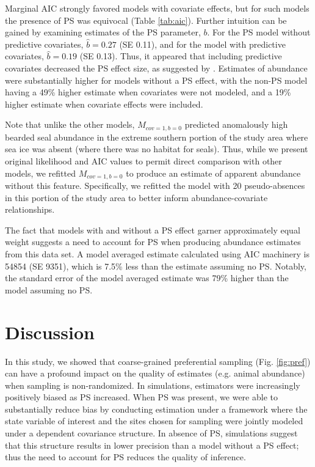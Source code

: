 \documentclass[times,mee,doublespace,]{besauth2}
\begin{document}
Marginal AIC strongly favored models with covariate effects, but for such models the presence of PS was equivocal (Table \ref{tab:aic}).  Further intuition can be gained by examining estimates of the PS parameter, $b$.  For the PS model without predictive covariates,  $\hat{b}=0.27$ (SE 0.11), and for the model with predictive covariates, $\hat{b}=0.19$ (SE 0.13).  Thus, it appeared that including predictive covariates decreased the PS effect size, as suggested by \citet{PatiEtAl2011}.  Estimates of abundance were substantially higher for models without a PS effect, with the non-PS model having a 49\% higher estimate when covariates were not modeled, and a 19\% higher estimate when covariate effects were included.

Note that unlike the other models, $M_{cov=1,b=0}$ predicted anomalously high bearded seal abundance in the extreme southern portion of the study area where sea ice was absent (where there was no habitat for seals).  Thus, while we present original likelihood and AIC values to permit direct comparison with other models, we refitted $M_{cov=1,b=0}$ to produce an estimate of apparent abundance without this feature. Specifically, we refitted the model with 20 pseudo-absences in this portion of the study area to better inform abundance-covariate relationships.

The fact that models with and without a PS effect garner approximately equal weight suggests a need to account for PS when producing abundance estimates from this data set.  A model averaged estimate calculated using AIC machinery \citep{BurnhamAnderson2002} is 54854 (SE 9351), which is 7.5\% less than the estimate assuming no PS.  Notably, the standard error of the model averaged estimate was 79\% higher than the model assuming no PS.

\section{Discussion}

In this study, we showed that coarse-grained preferential sampling (Fig. \ref{fig:pref}) can have a profound impact on the quality of estimates (e.g. animal abundance) when sampling is non-randomized. In simulations, estimators were increasingly positively biased as PS increased. When PS was present, we were able to substantially reduce bias by conducting estimation under a framework where the state variable of interest and the sites chosen for sampling were jointly modeled under a dependent covariance structure.  In absence of PS, simulations suggest that this structure results in lower precision than a model without a PS effect; thus the need to account for PS reduces the quality of inference.
\end{document}
